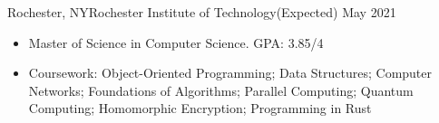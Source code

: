 \begin{cvsubsection}{Rochester, NY}{Rochester Institute of Technology}{(Expected) May 2021}
	\begin{itemize}
		\item Master of Science in Computer Science. GPA: 3.85/4
		\item Coursework: Object-Oriented Programming; Data Structures; Computer Networks; Foundations of Algorithms; Parallel Computing; Quantum Computing; Homomorphic Encryption; Programming in Rust
	\end{itemize}
\end{cvsubsection}